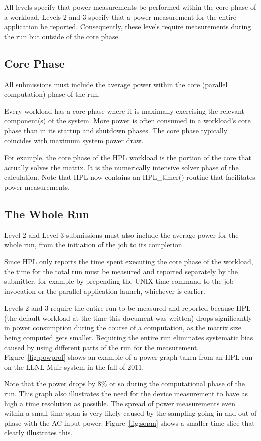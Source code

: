 \noindent
All levels specify that power measurements be performed within the core phase of a workload. Levels 2 and 3 specify that a power measurement for the entire application be reported. Consequently, these levels require measurements during the run but outside of the core phase.

\subsection{Core Phase}
\noindent
All submissions must include the average power within the core (parallel computation) phase of the run. 
\wl

\noindent
Every workload has a core phase where it is maximally exercising the relevant component(s) of the system. More power is often consumed in a workload's core phase than in its startup and shutdown phases. The core phase typically coincides with maximum system power draw. 
\wl

\noindent
For example, the core phase of the HPL workload is the portion of the core that actually solves the matrix. It is the numerically intensive solver phase of the calculation. Note that HPL now contains an HPL\_timer() routine that facilitates power measurements.

\subsection{The Whole Run}
\noindent
Level 2 and Level 3 submissions must also include the average power for the whole run, from the initiation of the job to its completion. 
\wl

\noindent
Since HPL only reports the time spent executing the core phase of the workload, the time for the total run must be measured and reported separately by the submitter, for example by prepending the UNIX time command to the job invocation or the parallel application launch, whichever is earlier.
\wl

\noindent
Levels 2 and 3 require the entire run to be measured and reported because HPL (the default workload at the time this document was written) drops significantly in power consumption during the course of a computation, as the matrix size being computed gets smaller.  Requiring the entire run eliminates systematic bias caused by using different parts of the run for the measurement. Figure~\ref{fig:powprof} shows an example of a power graph taken from an HPL run on the LLNL Muir system in the fall of 2011.
\wl

\noindent
Note that the power drops by 8\% or so during the computational phase of the run.  This graph also illustrates the need for the device measurement to have as high a time resolution as possible.  The spread of power measurements even within a small time span is very likely caused by the sampling going in and out of phase with the AC input power. Figure~\ref{fig:sopm} shows a smaller time slice that clearly illustrates this.
\wl


